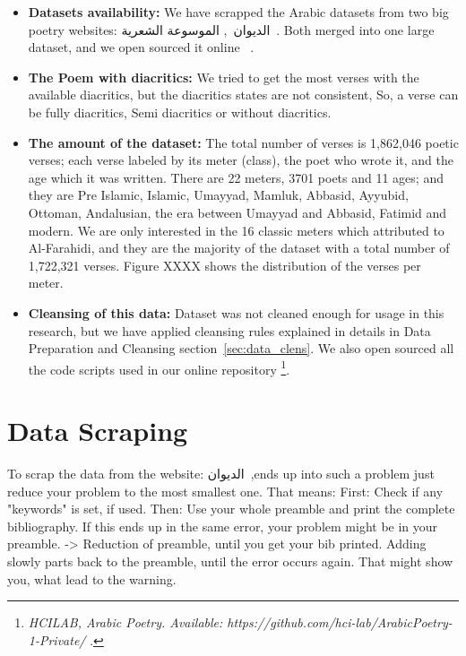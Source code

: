 \begin{itemize}

  \item \textbf{Datasets availability:} We have scrapped the Arabic datasets from two big poetry websites: \textarabic{الديوان}~\cite{diwan}, \textarabic{الموسوعة الشعرية}~\cite{PoetryEncyclopedia2016}. Both merged into one large dataset, and we open sourced it online ~\cite{ArabicpoetryDS}.

  \item \textbf{The Poem with diacritics:} We tried to get the most verses with the available diacritics, but the diacritics states are not consistent, So, a verse can be fully diacritics, Semi diacritics or without diacritics.

\item \textbf{The amount of the dataset:} The total number of verses is 1,862,046 poetic verses; each verse labeled by its meter (class), the poet who wrote it, and the age which it was written. There are 22 meters, 3701 poets and 11 ages; and they are Pre Islamic, Islamic, Umayyad, Mamluk, Abbasid, Ayyubid, Ottoman, Andalusian, the era between Umayyad and Abbasid, Fatimid and modern. We are only interested in the 16 classic meters which attributed to Al-Farahidi, and they are the majority of the dataset with a total number of 1,722,321 verses. Figure XXXX shows the distribution of the verses per meter. %
  
\item \textbf{Cleansing of this data:} Dataset was not cleaned enough for usage in this research, but we have applied cleansing rules explained in details in Data Preparation and Cleansing section~\ref{sec:data_clens}. We also open sourced all the code scripts used in our online repository \footnote{\textit{HCILAB, Arabic Poetry. Available: https://github.com/hci-lab/ArabicPoetry-1-Private/ }.}.
\end{itemize}



\section{Data Scraping}\label{sec:data_scrap}
To scrap the data from the website: \textarabic{الديوان}~\cite{diwan},ends up into such a problem just reduce your problem to the most smallest one. That means: First: Check if any "keywords" is set, if used. Then: Use your whole preamble and print the complete bibliography. If this ends up in the same error, your problem might be in your preamble. -> Reduction of preamble, until you get your bib printed. Adding slowly parts back to the preamble, until the error occurs again. That might show you, what lead to the warning.

